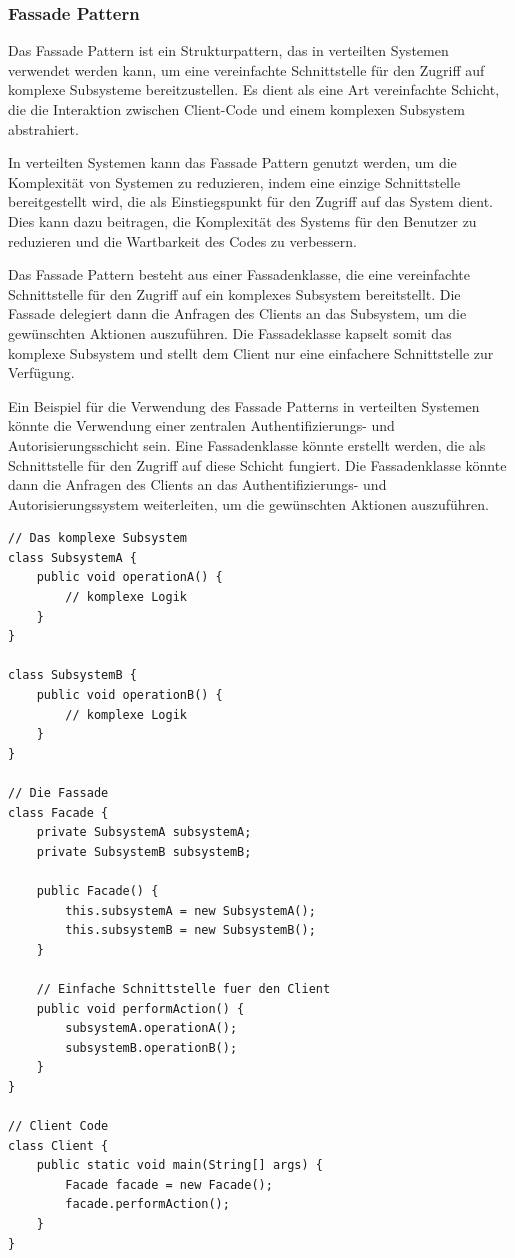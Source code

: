 \subsubsection{Fassade Pattern}
Das Fassade Pattern ist ein Strukturpattern, das in verteilten Systemen verwendet werden kann, um eine vereinfachte Schnittstelle für den Zugriff auf komplexe Subsysteme bereitzustellen. Es dient als eine Art vereinfachte Schicht, die die Interaktion zwischen Client-Code und einem komplexen Subsystem abstrahiert.

In verteilten Systemen kann das Fassade Pattern genutzt werden, um die Komplexität von Systemen zu reduzieren, indem eine einzige Schnittstelle bereitgestellt wird, die als Einstiegspunkt für den Zugriff auf das System dient. Dies kann dazu beitragen, die Komplexität des Systems für den Benutzer zu reduzieren und die Wartbarkeit des Codes zu verbessern.

Das Fassade Pattern besteht aus einer Fassadenklasse, die eine vereinfachte Schnittstelle für den Zugriff auf ein komplexes Subsystem bereitstellt. Die Fassade delegiert dann die Anfragen des Clients an das Subsystem, um die gewünschten Aktionen auszuführen. Die Fassadeklasse kapselt somit das komplexe Subsystem und stellt dem Client nur eine einfachere Schnittstelle zur Verfügung.

Ein Beispiel für die Verwendung des Fassade Patterns in verteilten Systemen könnte die Verwendung einer zentralen Authentifizierungs- und Autorisierungsschicht sein. Eine Fassadenklasse könnte erstellt werden, die als Schnittstelle für den Zugriff auf diese Schicht fungiert. Die Fassadenklasse könnte dann die Anfragen des Clients an das Authentifizierungs- und Autorisierungssystem weiterleiten, um die gewünschten Aktionen auszuführen.

\noindent\begin{minipage}{\textwidth}
\begin{lstlisting}[caption={Fassade Pattern},captionpos=b,label={lst:fassade}]
// Das komplexe Subsystem
class SubsystemA {
    public void operationA() {
        // komplexe Logik
    }
}

class SubsystemB {
    public void operationB() {
        // komplexe Logik
    }
}

// Die Fassade
class Facade {
    private SubsystemA subsystemA;
    private SubsystemB subsystemB;
    
    public Facade() {
        this.subsystemA = new SubsystemA();
        this.subsystemB = new SubsystemB();
    }
    
    // Einfache Schnittstelle fuer den Client
    public void performAction() {
        subsystemA.operationA();
        subsystemB.operationB();
    }
}

// Client Code
class Client {
    public static void main(String[] args) {
        Facade facade = new Facade();
        facade.performAction();
    }
}
\end{lstlisting}
\end{minipage}

